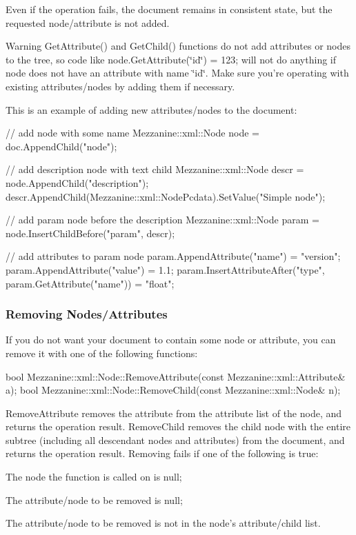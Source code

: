 Even if the operation fails, the document remains in consistent state, but the requested node/attribute is not added. \begin{DoxyWarning}{Warning}
GetAttribute() and GetChild() functions do not add attributes or nodes to the tree, so code like node.GetAttribute(\char`\"{}id\char`\"{}) = 123; will not do anything if node does not have an attribute with name \char`\"{}id\char`\"{}. Make sure you're operating with existing attributes/nodes by adding them if necessary.
\end{DoxyWarning}
This is an example of adding new attributes/nodes to the document: 
\begin{DoxyCode}
 // add node with some name
 Mezzanine::xml::Node node = doc.AppendChild("node");

 // add description node with text child
 Mezzanine::xml::Node descr = node.AppendChild("description");
 descr.AppendChild(Mezzanine::xml::NodePcdata).SetValue("Simple node");

 // add param node before the description
 Mezzanine::xml::Node param = node.InsertChildBefore("param", descr);

 // add attributes to param node
 param.AppendAttribute("name") = "version";
 param.AppendAttribute("value") = 1.1;
 param.InsertAttributeAfter("type", param.GetAttribute("name")) = "float";
\end{DoxyCode}
 \hypertarget{XMLManual_XMLModifyingRemoving}{}\subsubsection{Removing Nodes/Attributes}\label{XMLManual_XMLModifyingRemoving}
If you do not want your document to contain some node or attribute, you can remove it with one of the following functions: 
\begin{DoxyCode}
 bool Mezzanine::xml::Node::RemoveAttribute(const Mezzanine::xml::Attribute& a);
 bool Mezzanine::xml::Node::RemoveChild(const Mezzanine::xml::Node& n);
\end{DoxyCode}
 RemoveAttribute removes the attribute from the attribute list of the node, and returns the operation result. RemoveChild removes the child node with the entire subtree (including all descendant nodes and attributes) from the document, and returns the operation result. Removing fails if one of the following is true:
\begin{DoxyItemize}
\item The node the function is called on is null;
\item The attribute/node to be removed is null;
\item The attribute/node to be removed is not in the node's attribute/child list.
\end{DoxyItemize}

